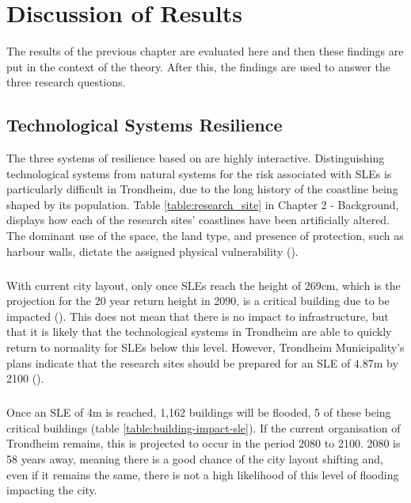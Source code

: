 

\chapter{Discussion of Results}
The results of the previous chapter are evaluated here and then these findings are put in the context of the theory. After this, the findings are used to answer the three research questions. 



\section{Technological Systems Resilience}
The three systems of resilience based on \cite{cutter_place-based_2008} are highly interactive. Distinguishing technological systems from natural systems for the risk associated with SLEs is particularly difficult in Trondheim, due to the long history of the coastline being shaped by its population. Table \ref{table:research_site} in Chapter 2 - Background, displays how each of the research sites' coastlines have been artificially altered. The dominant use of the space, the land type, and presence of protection, such as harbour walls, dictate the assigned physical vulnerability (\cite{opach_seeking_2020}).
\paragraph{}

With current city layout, only once SLEs reach the height of 269cm, which is the projection for the 20 year return height in 2090, is a critical building due to be impacted (\cite{kartverket_se_2020}). This does not mean that there is no impact to infrastructure, but that it is likely that the technological systems in Trondheim are able to quickly return to normality for SLEs below this level. However, Trondheim Municipality's plans indicate that the research sites should be prepared for an SLE  of 4.87m by 2100 (\cite{hanssen_saksframlegg_2013}).
\paragraph{}
Once an SLE of 4m is reached, 1,162 buildings will be flooded, 5 of these being critical buildings (table \ref{table:building-impact-sle}). If the current organisation of Trondheim remains, this is projected to occur in the period 2080 to 2100. 2080 is 58 years away, meaning there is a good chance of the city layout shifting and, even if it remains the same, there is not a high likelihood of this level of flooding impacting the city.  
